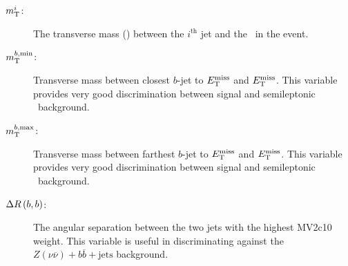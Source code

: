 			\begin{description}
				\item[\boldmath $m_{\mathrm{T}}^{i}$:] The transverse mass (\mt) between the $i^{\mathrm{th}}$ jet and the \met\ in the event. %
				\item[\boldmath $m_{\mathrm{T}}^{b,\mathrm{min}}$:] Transverse mass between closest $b$-jet to $E_{\mathrm{T}}^{\mathrm{miss}}$ and $E_{\mathrm{T}}^{\mathrm{miss}}$. This variable provides very good discrimination between signal and semileptonic \ttbar\ background.
				\item[\boldmath $m_{\mathrm{T}}^{b,\mathrm{max}}$:] Transverse mass between farthest $b$-jet to $E_{\mathrm{T}}^{\mathrm{miss}}$ and $E_{\mathrm{T}}^{\mathrm{miss}}$. This variable provides very good discrimination between signal and semileptonic \ttbar\ background.
				\item[\boldmath $\Delta R\left(b,b\right)$:] The angular separation between the two jets with the highest MV2c10 weight. This variable is useful in discriminating against the $Z(\nu\overline\nu)+b\overline{b}+\mathrm{jets}$ background.
			\end{description}


